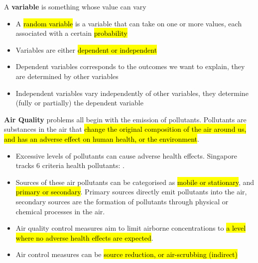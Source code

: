 \documentclass{article}
\newcommand{\headingsmall}[1]{{\small\textbf{#1}}}
\begin{document}
\begin{multicols*}{4}
A \headingsmall{variable} is something whose value can vary
\begin{itemize} \itemsep -0.5em
    \item A \hl{random variable} is a variable that can take on one or more
        values, each associated with a certain \hl{probability}
    \item Variables are either \hl{dependent or independent}
    \item Dependent variables corresponds to the outcomes we want to explain, 
        they are determined by other variables
    \item Independent variables vary independently of other variables, they
        determine (fully or partially) the dependent variable
\end{itemize}

\headingsmall{Air Quality} problems all begin with the emission of
pollutants. Pollutants are substances in the air that \hl{change the
original composition of the air around us, and has an adverse effect on
human health, or the environment}. 
\begin{itemize} \itemsep -0.5em
    \item Excessive levels of pollutants can cause adverse health 
        effects. Singapore tracks 6 criteria health pollutants: 
        . 
    \item Sources of these air pollutants can be categorised as 
        \hl{mobile or stationary}, and \hl{primary or secondary}. 
        Primary sources directly emit pollutants into the air, 
        secondary sources are the formation of pollutants through
        physical or chemical processes in the air.
    \item Air quality control measures aim to limit airborne 
        concentrations to \hl{a level where no adverse health effects 
        are expected}.
    \item Air control measures can be \hl{source reduction, or
        air-scrubbing (indirect)}
\end{itemize}


\end{multicols*}
\end{document}
